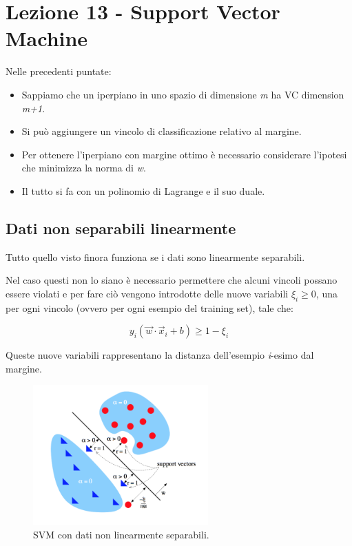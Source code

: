 \section{Lezione 13 - Support Vector Machine}\label{lezione-13---support-vector-machine}

Nelle precedenti puntate:

\begin{itemize}
\item
  Sappiamo che un iperpiano in uno spazio di dimensione \textit{m} ha VC
  dimension \textit{m+1}.
\item
  Si può aggiungere un vincolo di classificazione relativo al margine.
\item
  Per ottenere l'iperpiano con margine ottimo è necessario considerare
  l'ipotesi che minimizza la norma di \emph{w}.
\item
  Il tutto si fa con un polinomio di Lagrange e il suo duale.
\end{itemize}

\subsection{Dati non separabili linearmente}\label{dati-non-separabili-linearmente}

Tutto quello visto finora funziona se i dati sono linearmente
separabili.

Nel caso questi non lo siano è necessario permettere che alcuni vincoli possano essere violati e per fare ciò vengono introdotte delle nuove variabili $\xi_i \geq 0$, una per ogni vincolo (ovvero per ogni esempio del training set), tale che:

$$ y_i (\vec{w} \cdot \vec{x}_i + b) \geq 1 - \xi_i $$

Queste nuove variabili rappresentano la distanza dell'esempio \textit{i}-esimo dal margine.

\begin{figure}[htbp]
\centering
\includegraphics[width = 0.6\textwidth]{./notes/immagini/l13-non-linear.png}
\caption{SVM con dati non linearmente separabili.}
\end{figure}

